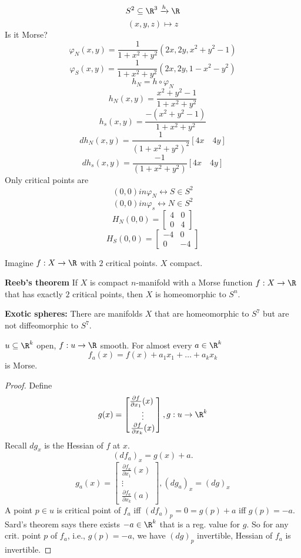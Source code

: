 \begin{example}
  $$S^2 \subseteq \R^3 \xrightarrow{ h} \R$$
  $$(x,y,z) \mapsto z$$
  Is it Morse?
    $$\varphi _N(x,y) = \frac{1}{1+x^2+y^2}\left(2x,2y,x^2+y^2-1\right)$$
    $$\varphi _S(x,y)=\frac{1}{1+x^2+y^2}\left(2x,2y,1-x^2-y^2\right)$$
    $$h_N=h \circ \varphi _N$$
    $$h_N(x,y)=\frac{x^2+y^2-1}{1+x^2+y^2}$$
    $$h_s(x,y)=\frac{-(x^2+y^2-1)}{1+x^2+y^2}$$
    $$dh_N(x,y)=\frac{1}{(1+x^2+y^2)^2}[4x \quad 4y]$$
    $$dh_s(x,y)=\frac{-1}{(1+x^2+y^2)}[4x \quad 4y]$$
    Only critical points are
    $$(0,0) in \varphi _N \leftrightarrow S \in S^2$$
    $$(0,0) in \varphi _s \leftrightarrow N \in S^2$$
    $$H_N(0,0) =
    \begin{bmatrix}
      4 & 0 \\
      0 & 4
    \end{bmatrix}$$
    $$H_S(0,0)=
    \begin{bmatrix}
      -4 & 0 \\
      0 & -4
    \end{bmatrix}$$
\end{example}
Imagine $f: X \to \R$ with $2$ critical points. $X$ compact.
\begin{theorem}
  \textbf{Reeb's theorem} If $X$ is compact $n$-manifold with a Morse function $f: X \to \R$ that has exactly $2$ critical points, then $X$ is homeomorphic to $S^n$.
\end{theorem}
\textbf{Exotic spheres: }There are manifolds $X$ that are homeomorphic to $S^7$ but are not diffeomorphic to $S^7$.

\begin{lemma}
  $u \subseteq \R^k$ open, $f: u \to \R$ smooth. For almost every $a\in \R^k$
    $$f_a(x)=f(x)+a_1x_1+\dots+a_kx_k$$
  is Morse.
\end{lemma}
\begin{proof}
  Define
    $$g(x)=
    \begin{bmatrix}
        \frac{\partial f}{\partial x_1}(x) \\
        \vdots \\
        \frac{\partial f}{\partial x_k}(x)
    \end{bmatrix}, g: u \to \R^k$$
    Recall $dg_x$ is the Hessian of $f$ at $x$.
      $$(df_a)_x= g(x)+a.$$
      $$g_a(x)=\begin{bmatrix}
          \frac{\partial f_a}{\partial x_1}(x) \\
          \vdots \\
          \frac{\partial f_a}{\partial x_k}(a)
      \end{bmatrix}, (dg_a)_x=(dg)_x$$
      A point $p\in u$ is critical point of $f_a$ iff $(df_a)_p=0=g(p)+a$ iff $g(p)=-a$.
      \newline Sard's theorem says there exists $-a\in \R^k$ that is a reg. value for $g$. So for any crit. point $p$ of $f_a$, i.e., $g(p)=-a$, we have $(dg)_p$ invertible, Hessian of $f_a$ is invertible.
        \qedhere
\end{proof}

